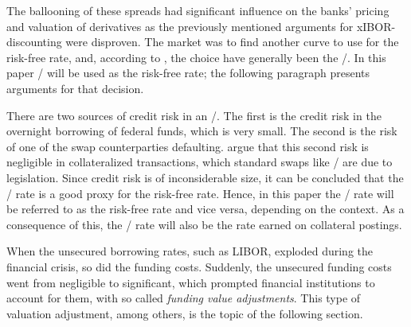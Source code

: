 \documentclass[main.tex]{subfiles}
\begin{document}
    The ballooning of these spreads
    had significant influence on the banks' pricing and valuation of derivatives
    as the previously mentioned arguments for xIBOR-discounting were disproven.
    The market was to find another curve to use for the risk-free rate,
    and, according to \textcite{Green2015XVA}, the choice have generally been the \OIS/.
    In this paper \OIS/ will be used as the risk-free rate;
    the following paragraph presents arguments for that decision.

    There are two sources of credit risk in an \OIS/.
    The first is the credit risk in the overnight borrowing of federal funds, which is very small. 
    The second is the risk of one of the swap counterparties defaulting.
    \textcite{HullWhiteOISvsLIBOR}
    argue that this second risk is negligible in collateralized transactions,
    which standard swaps like \OIS/ are due to legislation.
    Since credit risk is of inconsiderable size, it can be concluded 
    that the \OIS/ rate is a good proxy for the risk-free rate.
    Hence, in this paper the \OIS/ rate will be referred to as the risk-free rate
    and vice versa, depending on the context.
    As a consequence of this, the \OIS/ rate will also be the rate earned on collateral postings.

    When the unsecured borrowing rates, such as LIBOR, exploded during the financial crisis, 
    so did the funding costs. 
    Suddenly, the unsecured funding costs went from negligible to significant,
    which prompted financial institutions to account for them, 
    with so called \textit{funding value adjustments}. 
    This type of valuation adjustment, among others, is the topic of the following section.
\end{document}
